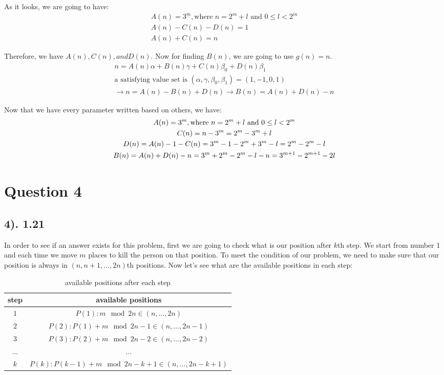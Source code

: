 \documentclass[12pt]{article}
\begin{document}
As it looks, we are going to have:
\begin{gather*}
    A(n) = 3^m, \text{where } n = 2^m + l \text{ and } 0 \leq l < 2^m \\
    A(n) - C(n) - D(n) = 1 \\
    A(n) + C(n) = n
\end{gather*}

Therefore, we have $A(n), C(n), and D(n)$. Now for finding $B(n)$, we are going to use $g(n)=n$.
\begin{gather*}
    n = A(n) \alpha + B(n) \gamma + C(n) \beta_{0} + D(n) \beta_{1} \\
    \text{a satisfying value set is } (\alpha, \gamma, \beta_{0}, \beta_{1}) = (1, -1, 0, 1) \\
    \to n = A(n) - B(n) + D(n) \to B(n) = A(n) + D(n) - n
\end{gather*}

Now that we have every parameter written based on others, we have:
\begin{gather*}
    A(n) = 3^m, \text{where } n = 2^m + l \text{ and } 0 \leq l < 2^m \\
    C(n) = n - 3^m = 2^m - 3^m + l \\
    D(n) = A(n) - 1 - C(n) = 3^m - 1 - 2^m + 3^m - l = 2 \time 3^m - 2^m - l \\
    B(n) = A(n) + D(n) - n = 3^m + 2 \time 3^m - 2^m - l - n = 3^{m+1} - 2^{m+1} -2l
\end{gather*}


\section*{Question 4}
\subsection*{4). 1.21}
In order to see if an answer exists for this problem, first we are going to check what is our position after $k$th step. We start from number 1 and each time we move $m$ places to kill the person on that position.
To meet the condition of our problem, we need to make sure that our position is always in $(n, n+1, \ldots, 2n)$th positions. Now let's see what are the available positions in each step:
\begin{table}[h]
    \centering
    \begin{tabular}{|c|c|}
        \hline
        step & available positions \\
        \hline
        $1$ & $P(1): m \mod 2n \in (n, \ldots, 2n)$ \\
        \hline
        $2$ & $P(2): P(1) + m \mod {2n-1} \in (n, \ldots, 2n-1)$ \\
        \hline
        $3$ & $P(3): P(2) + m \mod {2n-2} \in (n, \ldots, 2n-2)$ \\
        \hline
        $\ldots$ & $\ldots$ \\
        \hline
        $k$ & $P(k): P(k-1) + m \mod {2n-k+1} \in (n, \ldots, 2n-k+1)$ \\
        \hline
    \end{tabular}
    \caption{available positions after each step}
    \label{tab:sample}
\end{table}
\end{document}
